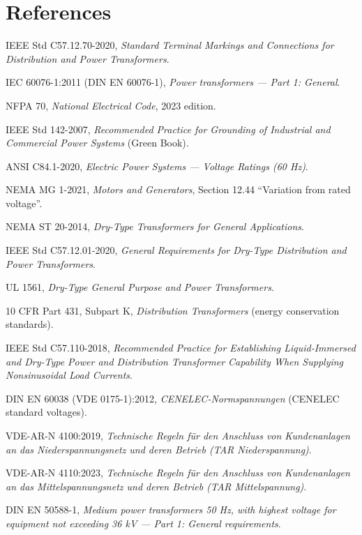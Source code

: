 \section{References}
\label{sec:references}

\begin{enumerate}[label={[\arabic*]}, leftmargin=*, itemsep=0.4em]
  \item IEEE Std C57.12.70-2020, \emph{Standard Terminal Markings and Connections for Distribution and Power Transformers}.
  \item IEC 60076-1:2011 (DIN EN 60076-1), \emph{Power transformers --- Part 1: General}.
  \item NFPA 70, \emph{National Electrical Code}, 2023 edition.
  \item IEEE Std 142-2007, \emph{Recommended Practice for Grounding of Industrial and Commercial Power Systems} (Green Book).
  \item ANSI C84.1-2020, \emph{Electric Power Systems --- Voltage Ratings (60 Hz)}.
  \item NEMA MG 1-2021, \emph{Motors and Generators}, Section 12.44 ``Variation from rated voltage''.
  \item NEMA ST 20-2014, \emph{Dry-Type Transformers for General Applications}.
  \item IEEE Std C57.12.01-2020, \emph{General Requirements for Dry-Type Distribution and Power Transformers}.
  \item UL 1561, \emph{Dry-Type General Purpose and Power Transformers}.
  \item 10 CFR Part 431, Subpart K, \emph{Distribution Transformers} (energy conservation standards).
  \item IEEE Std C57.110-2018, \emph{Recommended Practice for Establishing Liquid-Immersed and Dry-Type Power and Distribution Transformer Capability When Supplying Nonsinusoidal Load Currents}.
  \item DIN EN 60038 (VDE 0175-1):2012, \emph{CENELEC-Normspannungen} (CENELEC standard voltages).
  \item VDE-AR-N 4100:2019, \emph{Technische Regeln für den Anschluss von Kundenanlagen an das Niederspannungsnetz und deren Betrieb (TAR Niederspannung)}.
  \item VDE-AR-N 4110:2023, \emph{Technische Regeln für den Anschluss von Kundenanlagen an das Mittelspannungsnetz und deren Betrieb (TAR Mittelspannung)}.
  \item DIN EN 50588-1, \emph{Medium power transformers 50 Hz, with highest voltage for equipment not exceeding 36 kV --- Part 1: General requirements}.

\end{enumerate}
